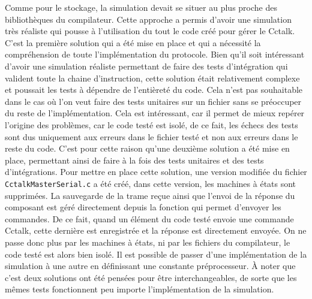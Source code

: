 \documentclass[a4paper]{article}
\begin{document}
Comme pour le stockage, la simulation devait se situer au plus proche des
bibliothèques du compilateur. Cette approche a permis d'avoir une simulation
très réaliste qui pousse à l'utilisation du tout le code créé pour gérer le
Cctalk. C'est la première solution qui a été mise en place et qui a nécessité la
compréhension de toute l'implémentation du protocole. Bien qu'il soit
intéressant d'avoir une simulation réaliste permettant de faire des tests
d'intégration qui valident toute la chaine d'instruction, cette solution était
relativement complexe et poussait les tests à dépendre de l'entièreté du code.
Cela n'est pas souhaitable dans le cas où l'on veut faire des tests unitaires
sur un fichier sans se préoccuper du reste de l'implémentation. Cela est
intéressant, car il permet de mieux repérer l'origine des problèmes, car le code
testé est isolé, de ce fait, les échecs des tests sont dus uniquement aux
erreurs dans le fichier testé et non aux erreurs dans le reste du code. C'est
pour cette raison qu'une deuxième solution a été mise en place, permettant ainsi
de faire à la fois des tests unitaires et des tests d'intégrations. Pour mettre
en place cette solution, une version modifiée du fichier
\verb|CctalkMasterSerial.c| a été créé, dans cette version, les machines à états
sont supprimées. La sauvegarde de la trame reçue ainsi que l'envoi de la réponse
du composant est géré directement depuis la fonction qui permet d'envoyer les
commandes. De ce fait, quand un élément du code testé envoie une commande
Cctalk, cette dernière est enregistrée et la réponse est directement envoyée. On
ne passe donc plus par les machines à états, ni par les fichiers du compilateur,
le code testé est alors bien isolé. Il est possible de passer d'une
implémentation de la simulation à une autre en définissant une constante
préprocesseur. À noter que c'est deux solutions ont été pensées pour être
interchangeables, de sorte que les mêmes tests fonctionnent peu importe
l'implémentation de la simulation.
\end{document}
